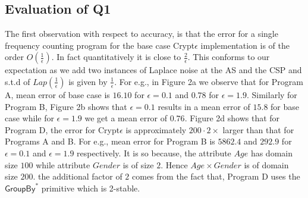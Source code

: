 \subsection{Evaluation of Q1}
The first observation with respect to accuracy, is that the error for a single frequency counting program for the base case Crypt$\epsilon$ implementation is of the order $O(\frac{1}{\epsilon})$. In fact quantitatively it is close to $\frac{2}{\epsilon}$. This conforms to our expectation as we add two instances of Laplace noise at the \textsf{AS} and the \textsf{CSP} and s.t.d of $Lap(\frac{1}{\epsilon})$ is given by $\frac{1}{\epsilon}$. For e.g., in Figure 2a we observe that for Program A, mean error of base case \system is $16.10$ for $\epsilon=0.1$ and $0.78$ for $\epsilon=1.9$. Similarly for Program B, Figure 2b shows that  $\epsilon=0.1$ results in a mean error of $15.8$ for base case \system while for $\epsilon=1.9$ we get a mean error of $0.76$. Figure 2d shows that  for Program D, the  error for Crypt$\epsilon$ is approximately $200\cdot 2 \times $ larger than that for Programs A and B. For e.g., mean error for Program B is $5862.4$ and $292.9$ for $\epsilon=0.1$ and $\epsilon=1.9$ respectively. It is so because, the attribute $Age$ has domain size $100$ while attribute $Gender$ is of size $2$. Hence $Age\times Gender$ is of domain size $200$. the additional factor of $2$ comes from the fact that, Program D uses the $\textsf{GroupBy}^*$ primitive which is 2-stable.  
 \par 
